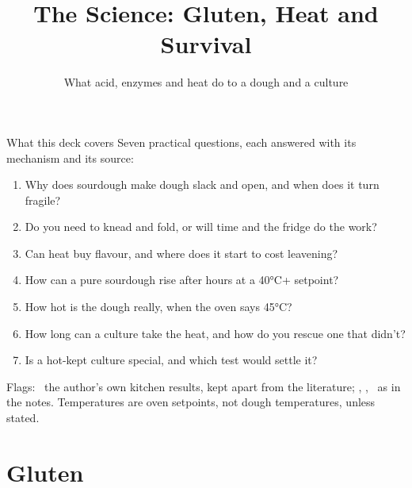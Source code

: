 \documentclass[aspectratio=169,11pt]{beamer}
\title[The Science]{The Science: Gluten, Heat and Survival}
\subtitle{What acid, enzymes and heat do to a dough and a culture}
\newcommand{\muted}[1]{{\color{muted}#1}}
\begin{document}
\begin{frame}[plain]\titlepage\end{frame}

\begin{frame}{What this deck covers}
  Seven practical questions, each answered with its mechanism and its source:
  \begin{enumerate}\setlength{\itemsep}{0pt}
    \item Why does sourdough make dough slack and open, and when does it turn fragile?
    \item Do you need to knead and fold, or will time and the fridge do the work?
    \item Can heat buy flavour, and where does it start to cost leavening?
    \item How can a pure sourdough rise after hours at a 40°C+ setpoint?
    \item How hot is the dough really, when the oven says 45°C?
    \item How long can a culture take the heat, and how do you rescue one that didn't?
    \item Is a hot-kept culture special, and which test would settle it?
  \end{enumerate}
  \smallskip
  {\footnotesize\muted{Flags: \ownresult\ the author's own kitchen results, kept apart
  from the literature; \hypothesis, \contested, \untested\ as in the notes.
  Temperatures are oven setpoints, not dough temperatures, unless stated.}\par}
\end{frame}

\section{Gluten}
\end{document}
